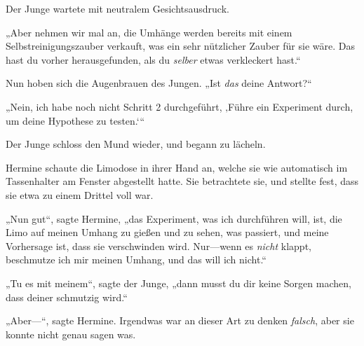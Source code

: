 Der Junge wartete mit neutralem Gesichtsausdruck.

„Aber nehmen wir mal an, die Umhänge werden bereits mit einem Selbstreinigungszauber verkauft, was ein sehr nützlicher Zauber für sie wäre. Das hast du vorher herausgefunden, als du \emph{selber} etwas verkleckert hast.“

Nun hoben sich die Augenbrauen des Jungen. „Ist \emph{das} deine Antwort?“

„Nein, ich habe noch nicht Schritt 2 durchgeführt, ‚Führe ein Experiment durch, um deine Hypothese zu testen.‘“

Der Junge schloss den Mund wieder, und begann zu lächeln.

Hermine schaute die Limodose in ihrer Hand an, welche sie wie automatisch im Tassenhalter am Fenster abgestellt hatte. Sie betrachtete sie, und stellte fest, dass sie etwa zu einem Drittel voll war.

„Nun gut“, sagte Hermine, „das Experiment, was ich durchführen will, ist, die Limo auf meinen Umhang zu gießen und zu sehen, was passiert, und meine Vorhersage ist, dass sie verschwinden wird. Nur—wenn es \emph{nicht} klappt, beschmutze ich mir meinen Umhang, und das will ich nicht.“

„Tu es mit meinem“, sagte der Junge, „dann musst du dir keine Sorgen machen, dass deiner schmutzig wird.“

„Aber—“, sagte Hermine. Irgendwas war an dieser Art zu denken \emph{falsch}, aber sie konnte nicht genau sagen was.

